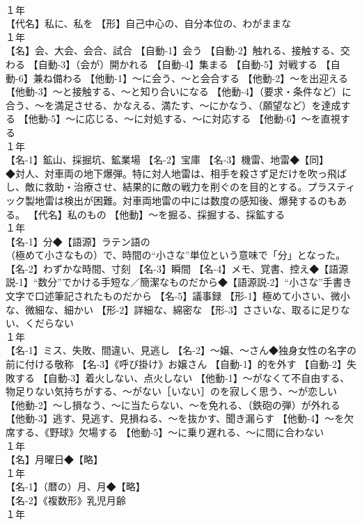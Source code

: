 \documentclass[8pt]{extreport}
\begin{document}
\begin{CJK}{UTF8}{min}
\\	１年	
\\	【代名】私に、私を 【形】自己中心の、自分本位の、わがままな
\\	１年	
\\	【名】会、大会、会合、試合 【自動-1】会う 【自動-2】触れる、接触する、交わる 【自動-3】（会が）開かれる 【自動-4】集まる 【自動-5】対戦する 【自動-6】兼ね備わる 【他動-1】～に会う、～と会合する 【他動-2】～を出迎える 【他動-3】～と接触する、～と知り合いになる 【他動-4】（要求・条件など）に合う、～を満足させる、かなえる、満たす、～にかなう、（願望など）を達成する 【他動-5】～に応じる、～に対処する、～に対応する 【他動-6】～を直視する
\\	１年	
\\	【名-1】鉱山、採掘坑、鉱業場 【名-2】宝庫 【名-3】機雷、地雷◆【同】
\\	◆対人、対車両の地下爆弾。特に対人地雷は、相手を殺さず足だけを吹っ飛ばし、敵に救助・治療させ、結果的に敵の戦力を削ぐのを目的とする。プラスティック製地雷は検出が困難。対車両地雷の中には数度の感知後、爆発するのもある。 【代名】私のもの 【他動】～を掘る、採掘する、採鉱する
\\	１年	
\\	【名-1】分◆【語源】ラテン語の 
\\	（極めて小さなもの）で、時間の“小さな”単位という意味で「分」となった。 【名-2】わずかな時間、寸刻 【名-3】瞬間 【名-4】メモ、覚書、控え◆【語源説-1】“数分”でかける手短な／簡潔なものだから◆【語源説-2】“小さな”手書き文字で口述筆記されたものだから 【名-5】議事録 【形-1】極めて小さい、微小な、微細な、細かい 【形-2】詳細な、綿密な 【形-3】ささいな、取るに足りない、くだらない
\\	１年	
\\	【名-1】ミス、失敗、間違い、見逃し 【名-2】～嬢、～さん◆独身女性の名字の前に付ける敬称 【名-3】《呼び掛け》お嬢さん 【自動-1】的を外す 【自動-2】失敗する 【自動-3】着火しない、点火しない 【他動-1】～がなくて不自由する、物足りない気持ちがする、～がない［いない］のを寂しく思う、～が恋しい 【他動-2】～し損なう、～に当たらない、～を免れる、（鉄砲の弾）が外れる 【他動-3】逃す、見逃す、見損ねる、～を抜かす、聞き漏らす 【他動-4】～を欠席する、《野球》欠場する 【他動-5】～に乗り遅れる、～に間に合わない
\\	１年	
\\	【名】月曜日◆【略】
\\	１年	
\\	【名-1】（暦の）月、月◆【略】
\\	【名-2】《複数形》乳児月齢
\\	１年	

\end{CJK}
\end{document}
